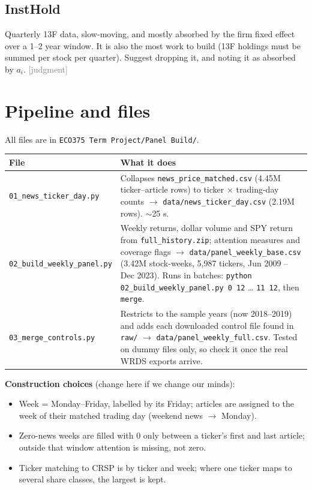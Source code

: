 \documentclass[11pt]{article}
\newcommand{\judg}{\textcolor{Gray}{\textsf{[judgment]}}}
\newcommand{\var}[1]{\texttt{#1}}
\begin{document}
\subsection{InstHold}
Quarterly 13F data, slow-moving, and mostly absorbed by the firm fixed effect over a 1--2 year window. It is also the most work to build (13F holdings must be summed per stock per quarter). Suggest dropping it, and noting it as absorbed by $a_i$. \judg{}

\section{Pipeline and files}

All files are in \var{ECO375 Term Project/Panel Build/}.

\medskip\noindent
\begin{tabularx}{\textwidth}{>{\raggedright}p{4.6cm} >{\raggedright\arraybackslash}X}
\toprule
File & What it does\\
\midrule
\var{01\_news\_ticker\_day.py} & Collapses \var{news\_price\_matched.csv} (4.45M ticker--article rows) to ticker $\times$ trading-day counts $\rightarrow$ \var{data/news\_ticker\_day.csv} (2.19M rows). $\sim$25 s.\\
\var{02\_build\_weekly\_panel.py} & Weekly returns, dollar volume and SPY return from \var{full\_history.zip}; attention measures and coverage flags $\rightarrow$ \var{data/panel\_weekly\_base.csv} (3.42M stock-weeks, 5{,}987 tickers, Jun 2009 -- Dec 2023). Runs in batches: \var{python 02\_build\_weekly\_panel.py 0 12} \ldots{} \var{11 12}, then \var{merge}.\\
\var{03\_merge\_controls.py} & Restricts to the sample years (now 2018--2019) and adds each downloaded control file found in \var{raw/} $\rightarrow$ \var{data/panel\_weekly\_full.csv}. Tested on dummy files only, so check it once the real WRDS exports arrive.\\
\bottomrule
\end{tabularx}

\textbf{Construction choices} (change here if we change our minds):
\begin{itemize}
  \item Week = Monday--Friday, labelled by its Friday; articles are assigned to the week of their matched trading day (weekend news $\rightarrow$ Monday).
  \item Zero-news weeks are filled with 0 only between a ticker's first and last article; outside that window attention is missing, not zero.
  \item Ticker matching to CRSP is by ticker and week; where one ticker maps to several share classes, the largest is kept.
\end{itemize}
\end{document}

